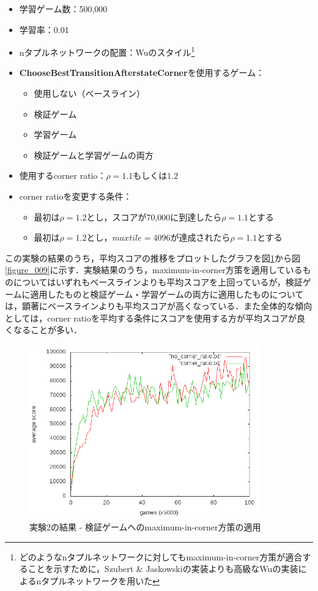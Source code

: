 \documentclass{suribt}
\begin{document}
\begin{itemize}
\item 学習ゲーム数：500,000
\item 学習率：0.01
\item nタプルネットワークの配置：Wuのスタイル\footnote{どのようなnタプルネットワークに対してもmaximum-in-corner方策が適合することを示すために，Szubert \& Jaskowskiの実装よりも高級なWuの実装によるnタプルネットワークを用いた}
\item \textbf{ChooseBestTransitionAfterstateCorner}を使用するゲーム：
\begin{itemize}
\item 使用しない（ベースライン）
\item 検証ゲーム
\item 学習ゲーム
\item 検証ゲームと学習ゲームの両方
\end{itemize}
\item 使用するcorner ratio：${\rho}=1.1 \text{もしくは} 1.2$
\item corner ratioを変更する条件：
\begin{itemize}
\item 最初は${\rho}=1.2$とし，スコアが70,000に到達したら${\rho}=1.1$とする
\item 最初は${\rho}=1.2$とし，$maxtile=4096$が達成されたら${\rho}=1.1$とする
\end{itemize}
\end{itemize}

この実験の結果のうち，平均スコアの推移をプロットしたグラフを図\ref{figure_007}から図\ref{figure_009}に示す．実験結果のうち，maximum-in-corner方策を適用しているものについてはいずれもベースラインよりも平均スコアを上回っているが，検証ゲームに適用したものと検証ゲーム・学習ゲームの両方に適用したものについては，顕著にベースラインよりも平均スコアが高くなっている．また全体的な傾向としては，corner ratioを平均する条件にスコアを使用する方が平均スコアが良くなることが多い．

\begin{figure}[t]
	\begin{center}
	\includegraphics[width=10cm]{figure_007.png}
	\caption{実験2の結果 - 検証ゲームへのmaximum-in-corner方策の適用}
	\label{figure_007}
	\end{center}
\end{figure}
\end{document}
